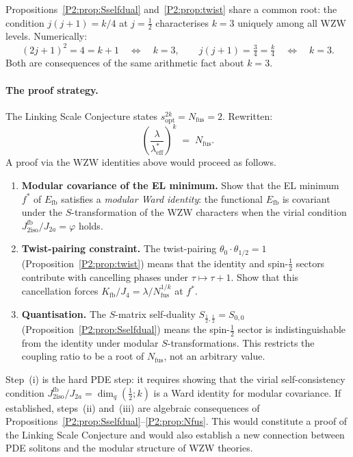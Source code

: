 \documentclass[11pt,a4paper]{article}
\newcommand{\vp}{\varphi}
\newcommand{\lam}{\lambda}
\newcommand{\leff}{\lambda_{\mathrm{eff}}}
\newcommand{\Kfb}{K_{\mathrm{fb}}}
\newcommand{\Efb}{E_{\mathrm{fb}}}
\newcommand{\Jfb}{J_{2\mathrm{iso}}^{\mathrm{fb}}}
\newcommand{\Ja}{J_{2a}}
\newcommand{\Jfour}{J_{4}}
\newcommand{\sopt}{s_{\mathrm{opt}}}
\theoremstyle{remark}
\begin{document}
Propositions~\ref{P2:prop:Sselfdual} and~\ref{P2:prop:twist} share a common
root: the condition $j(j+1)=k/4$ at $j=\frac{1}{2}$ characterises $k=3$
uniquely among all WZW levels.  Numerically:
\[
  (2j+1)^2 = 4 = k+1\quad\Leftrightarrow\quad k=3,
  \qquad
  j(j+1) = \tfrac{3}{4} = \tfrac{k}{4}\quad\Leftrightarrow\quad k=3.
\]
Both are consequences of the same arithmetic fact about $k=3$.

\paragraph{The proof strategy.}
The Linking Scale Conjecture states $\sopt^{2k}=N_{\mathrm{fus}}=2$.
Rewritten:
\begin{equation}
  \left(\frac{\lam}{\leff^*}\right)^k \;=\; N_{\mathrm{fus}}.
  \label{P2:eq:LSC_modular}
\end{equation}
A proof via the WZW identities above would proceed as follows.

\begin{enumerate}[label=\textup{(\roman*)}]
\item \textbf{Modular covariance of the EL minimum.}
  Show that the EL minimum $f^*$ of $\Efb$ satisfies a
  \emph{modular Ward identity}: the functional $\Efb$ is covariant
  under the $S$-transformation of the WZW characters when the
  virial condition $\Jfb/\Ja=\vp$ holds.
\item \textbf{Twist-pairing constraint.}
  The twist-pairing $\theta_0\cdot\theta_{1/2}=1$
  (Proposition~\ref{P2:prop:twist}) means that the identity and
  spin-$\frac{1}{2}$ sectors contribute with cancelling phases
  under $\tau\mapsto\tau+1$.  Show that this cancellation forces
  $\Kfb/\Jfour = \lam/N_{\mathrm{fus}}^{1/k}$ at $f^*$.
\item \textbf{Quantisation.}
  The $S$-matrix self-duality $S_{\frac12,\frac12}=S_{0,0}$
  (Proposition~\ref{P2:prop:Sselfdual}) means the spin-$\frac{1}{2}$
  sector is indistinguishable from the identity under modular
  $S$-transformations.  This restricts the coupling ratio to be
  a root of $N_{\mathrm{fus}}$, not an arbitrary value.
\end{enumerate}

Step~(i) is the hard PDE step: it requires showing that the
virial self-consistency condition $\Jfb/\Ja = \dim_q(\frac{1}{2};k)$
is a Ward identity for modular covariance.  If established, steps~(ii)
and~(iii) are algebraic consequences of
Propositions~\ref{P2:prop:Sselfdual}--\ref{P2:prop:Nfus}.  This would
constitute a proof of the Linking Scale Conjecture and would also
establish a new connection between PDE solitons and the modular
structure of WZW theories.
\end{document}
